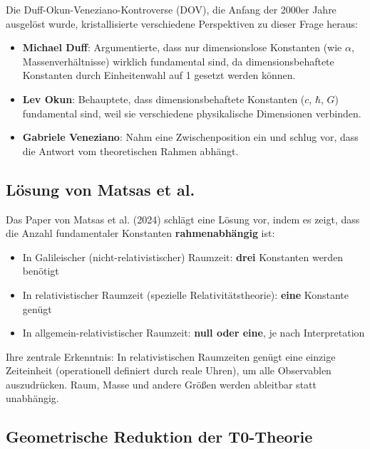 	Die Duff-Okun-Veneziano-Kontroverse (DOV), die Anfang der 2000er Jahre ausgelöst wurde, kristallisierte verschiedene Perspektiven zu dieser Frage heraus:
	
	\begin{itemize}
		\item \textbf{Michael Duff}: Argumentierte, dass nur dimensionslose Konstanten (wie $\alpha$, Massenverhältnisse) wirklich fundamental sind, da dimensionsbehaftete Konstanten durch Einheitenwahl auf 1 gesetzt werden können.
		
		\item \textbf{Lev Okun}: Behauptete, dass dimensionsbehaftete Konstanten ($c$, $\hbar$, $G$) fundamental sind, weil sie verschiedene physikalische Dimensionen verbinden.
		
		\item \textbf{Gabriele Veneziano}: Nahm eine Zwischenposition ein und schlug vor, dass die Antwort vom theoretischen Rahmen abhängt.
	\end{itemize}
	
	\subsection{Lösung von Matsas et al.}
	
	Das Paper von Matsas et al. (2024) schlägt eine Lösung vor, indem es zeigt, dass die Anzahl fundamentaler Konstanten \textbf{rahmenabhängig} ist:
	
	\begin{itemize}
		\item In Galileischer (nicht-relativistischer) Raumzeit: \textbf{drei} Konstanten werden benötigt
		\item In relativistischer Raumzeit (spezielle Relativitätstheorie): \textbf{eine} Konstante genügt
		\item In allgemein-relativistischer Raumzeit: \textbf{null oder eine}, je nach Interpretation
	\end{itemize}
	
	Ihre zentrale Erkenntnis: In relativistischen Raumzeiten genügt eine einzige Zeiteinheit (operationell definiert durch reale Uhren), um alle Observablen auszudrücken. Raum, Masse und andere Größen werden ableitbar statt unabhängig.
	
	\subsection{Geometrische Reduktion der T0-Theorie}
	
